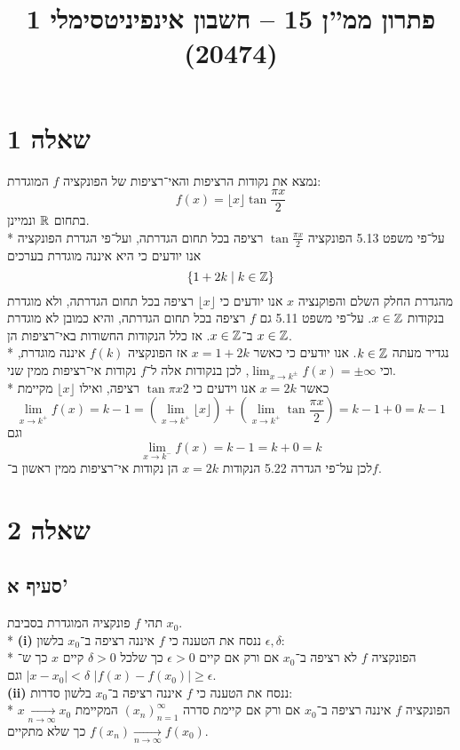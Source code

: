 
\title{פתרון ממ''ן 15 – חשבון אינפיניטסימלי 1 (20474)}


\maketitle
\section{שאלה 1}
נמצא את נקודות הרציפות והאי־רציפות של הפונקציה $f$ המוגדרת:
\[
	f(x) = \lfloor x \rfloor \tan \frac{\pi x}{2}
\]
בתחום $\mathbb{R}$ ונמיינן. \\*
על־פי משפט 5.13 הפונקציה $\tan \frac{\pi x}{2}$ רציפה בכל תחום הגדרתה, ועל־פי הגדרת הפונקציה אנו יודעים כי היא איננה מוגדרת בערכים
\[
	\left\{ 1 + 2k \mid k \in \mathbb{Z} \right\}
\]
מהגדרת החלק השלם והפוקנציה $x$ אנו יודעים כי $\lfloor x \rfloor$ רציפה בכל תחום הגדרתה, ולא מוגדרת בנקודות $x \in \mathbb{Z}$.
על־פי משפט 5.11 גם $f$ רציפה בכל תחום הגדרתה, והיא כמובן לא מוגדרת ב־$x \in \mathbb{Z}$.
אז כלל הנקודות החשודות באי־רציפות הן $x \in \mathbb{Z}$. \\*
נגדיר מעתה $k \in \mathbb{Z}$. אנו יודעים כי כאשר $x = 1 + 2k$ אז הפונקציה $f(k)$ איננה מוגדרת, וכי $\lim_{x \to k^\pm} f(x) = \pm \infty$,
לכן בנקודות אלה ל־$f$ נקודות אי־רציפות ממין שני. \\*
כאשר $x = 2k$ אנו וידעים כי $\tan{\pi x}{2}$ רציפה, ואילו $\lfloor x \rfloor$ מקיימת
\[
	\lim_{x \to k^+} f(x) = k - 1
	= \left( \lim_{x \to k^+} \lfloor x \rfloor \right) + \left( \lim_{x \to k^+} \tan \frac{\pi x}{2} \right)
	= k - 1 + 0
	= k - 1
\]
וגם
\[
	\lim_{x \to k^-} f(x) = k - 1
	= k + 0
	= k
\]
לכן על־פי הגדרה 5.22 הנקודות $x = 2k$ הן נקודות אי־רציפות ממין ראשון ב־$f$.

\section{שאלה 2}
\subsection{סעיף א'}
תהי $f$ פונקציה המוגדרת בסביבת $x_0$. \\*
\textbf{(i)}
ננסח את הטענה כי $f$ איננה רציפה ב־$x_0$ בלשון $\epsilon, \delta$: \\*
הפונקציה $f$ לא רציפה ב־$x_0$ אם ורק אם קיים $\epsilon > 0$ כך שלכל $\delta > 0$ קיים $x$ כך ש־$|x - x_0| < \delta$ וגם $|f(x) - f(x_0)| \ge \epsilon$. \\
\textbf{(ii)}
ננסח את הטענה כי $f$ איננה רציפה ב־$x_0$ בלשון סדרות: \\*
הפונקציה $f$ איננה רציפה ב־$x_0$ אם ורק אם קיימת סדרה ${(x_n)}_{n = 1}^\infty$ המקיימת $x \underset{n \to \infty}{\rightarrow} x_0$
כך שלא מתקיים $f(x_n) \underset{n \to \infty}{\rightarrow} f(x_0)$.

